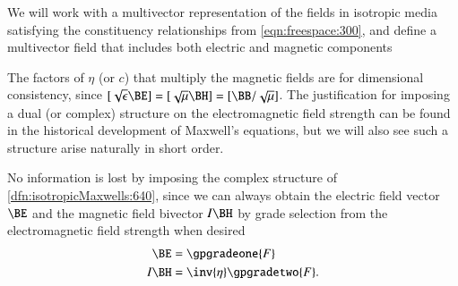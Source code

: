 %
%
We will work with a multivector representation of the fields in isotropic media satisfying the
constituency relationships from \cref{eqn:freespace:300}, and define a multivector field that includes both electric and magnetic components


The factors of \( \eta \) (or \( c \)) that multiply the magnetic fields are for dimensional consistency, since \( [\sqrt{\epsilon} \BE] = [\sqrt{\mu} \BH] = [\BB/\sqrt{\mu}]\).
The justification for imposing a dual (or complex) structure on the electromagnetic field strength can be found in the historical development of
Maxwell's equations, but we will also see such a structure arise naturally in short order.

No information is lost by imposing the complex structure of
\cref{dfn:isotropicMaxwells:640}, since we can always obtain the
electric field vector \( \BE \) and the magnetic field bivector \( I \BH \) by grade selection
from the electromagnetic field strength when desired
\begin{dmath}\label{eqn:isotropicMaxwells:620}
\begin{aligned}
\BE &= \gpgradeone{ F } \\
I \BH &= \inv{\eta} \gpgradetwo{ F }.
\end{aligned}
\end{dmath}

